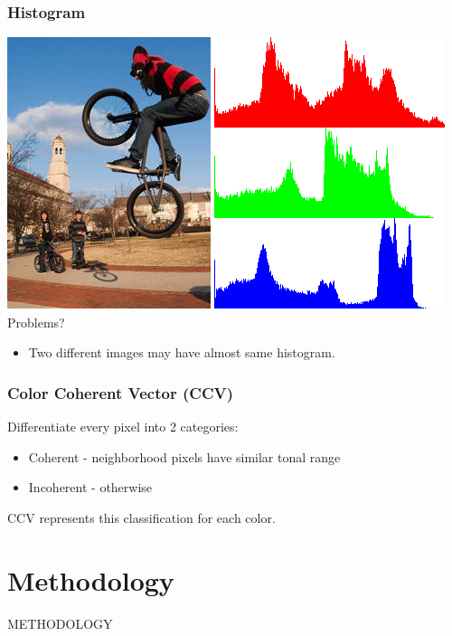 \documentclass[15pt]{beamer}
\begin{document}
\begin{frame}
\frametitle{Histogram}
\includegraphics[scale=0.45,center]{jump_hist}
\newline\pause
Problems?
\begin{itemize}[label=$\blacksquare$]
\item Two different images may have almost same histogram.
\end{itemize}
\end{frame}


\begin{frame}
\frametitle{Color Coherent Vector (CCV)}
Differentiate every pixel into 2 categories:
\begin{itemize}[label=$\blacksquare$]
\item Coherent - neighborhood pixels have similar tonal range
\item Incoherent - otherwise \newline \newline
\end{itemize}
\pause
CCV represents this classification for each color.
\end{frame}


\fontsize{9}{7}\selectfont


\section{Methodology}

\begin{frame}
\fontsize{18pt}{30}\selectfont
\centering
METHODOLOGY
\end{frame}
\end{document}
